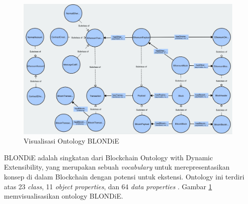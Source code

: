 \begin{figure}[ht]
  \centering
  \includegraphics[width=1\textwidth]{resources/chapter-2/blondie-visualization.jpg}
  \caption{Visualisasi Ontology BLONDiE \parencite{third2017linked}}
  \label{image:blondie-visualization}
\end{figure}

BLONDiE adalah singkatan dari Blockchain Ontology with Dynamic Extensibility, yang merupakan sebuah \textit{vocabulary} untuk merepresentasikan konsep di dalam Blockchain dengan potensi untuk ekstensi. Ontology ini terdiri atas 23 \textit{class}, 11 \textit{object properties}, dan 64 \textit{data properties} \parencite{hector2020blondie}. Gambar \ref{image:blondie-visualization} memvisualisasikan ontology BLONDiE.